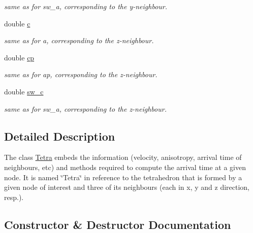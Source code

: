 \begin{DoxyCompactItemize}
\begin{DoxyCompactList}\small\item\em same as for sw\+\_\+a, corresponding to the y-\/neighbour. \end{DoxyCompactList}\item 
\hypertarget{class_tetra_adbab19053caa4eef4d37383b69c35ccc}{}double \hyperlink{class_tetra_adbab19053caa4eef4d37383b69c35ccc}{c}\label{class_tetra_adbab19053caa4eef4d37383b69c35ccc}

\begin{DoxyCompactList}\small\item\em same as for a, corresponding to the z-\/neighbour. \end{DoxyCompactList}\item 
\hypertarget{class_tetra_a3eed864590d999a6e7770b6fb9b05628}{}double \hyperlink{class_tetra_a3eed864590d999a6e7770b6fb9b05628}{cp}\label{class_tetra_a3eed864590d999a6e7770b6fb9b05628}

\begin{DoxyCompactList}\small\item\em same as for ap, corresponding to the z-\/neighbour. \end{DoxyCompactList}\item 
\hypertarget{class_tetra_a5cbd6123aa93aee733d6839a820c649f}{}double \hyperlink{class_tetra_a5cbd6123aa93aee733d6839a820c649f}{sw\+\_\+c}\label{class_tetra_a5cbd6123aa93aee733d6839a820c649f}

\begin{DoxyCompactList}\small\item\em same as for sw\+\_\+a, corresponding to the z-\/neighbour. \end{DoxyCompactList}\end{DoxyCompactItemize}


\subsection{Detailed Description}
The class \hyperlink{class_tetra}{Tetra} embeds the information (velocity, anisotropy, arrival time of neighbours, etc) and methods required to compute the arrival time at a given node. It is named \char`\"{}\+Tetra\char`\"{} in reference to the tetrahedron that is formed by a given node of interest and three of its neighbours (each in x, y and z direction, resp.). 

\subsection{Constructor \& Destructor Documentation}
\hypertarget{class_tetra_a3a693e516febb69a64eb9d6270390c4f}{}
